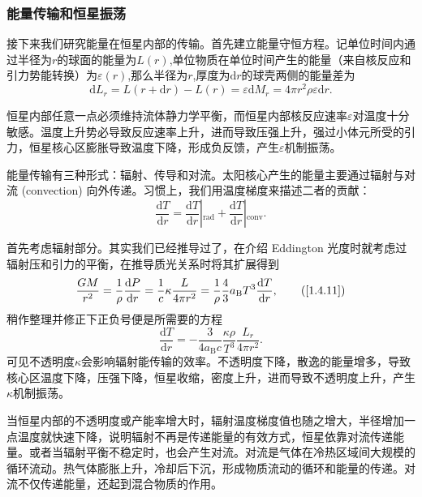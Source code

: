 \documentclass[../天体物理基础.tex]{subfiles}
\begin{document}
\subsubsection{能量传输和恒星振荡}
接下来我们研究能量在恒星内部的传输。首先建立能量守恒方程。记单位时间内通过半径为$r$的球面的能量为$L\left(r\right)$,单位物质在单位时间产生的能量（来自核反应和引力势能转换）为$\varepsilon\left(r\right)$,那么半径为$r$,厚度为$\mathrm{d}r$的球壳两侧的能量差为
\begin{equation}
\mathrm{d}L_{r}=L\left(r+\mathrm{d}r\right)-L\left(r\right)=\varepsilon\mathrm{d}M_{r}=4\pi{}r^{2}\rho\varepsilon\mathrm{d}r.
\end{equation}

恒星内部任意一点必须维持流体静力学平衡，而恒星内部核反应速率$\varepsilon$对温度十分敏感。温度上升势必导致反应速率上升，进而导致压强上升，强过小体元所受的引力，恒星核心区膨胀导致温度下降，形成负反馈，产生$\varepsilon$机制振荡。

能量传输有三种形式：辐射、传导和对流。太阳核心产生的能量主要通过辐射与对流 (convection) 向外传递。习惯上，我们用温度梯度来描述二者的贡献：
\begin{equation}
\frac{\mathrm{d}T}{\mathrm{d}r}=\left.\frac{\mathrm{d}T}{\mathrm{d}r}\right\vert{}_{\text{rad}}+\left.\frac{\mathrm{d}T}{\mathrm{d}r}\right\vert{}_{\text{conv}}.
\end{equation}

首先考虑辐射部分。其实我们已经推导过了，在介绍 Eddington 光度时就考虑过辐射压和引力的平衡，在推导质光关系时将其扩展得到
\begin{equation}
\frac{GM}{r^{2}}=\frac{1}{\rho}\frac{\mathrm{d}P}{\mathrm{d}r}=\frac{1}{c}\kappa\frac{L}{4\pi r^{2}}=\frac{1}{\rho}\frac{4}{3}a_{\text{B}}T^{3}\frac{\mathrm{d}T}{\mathrm{d}r},\tag{\ref{1.4.11}}
\end{equation}
稍作整理并修正下正负号便是所需要的方程
\begin{equation}
\frac{\mathrm{d}T}{\mathrm{d}r}=-\frac{3}{4a_{\text{B}}c}\frac{\kappa\rho}{T^{3}}\frac{L_{r}}{4\pi r^{2}}.
\end{equation}
可见不透明度$\kappa$会影响辐射能传输的效率。不透明度下降，散逸的能量增多，导致核心区温度下降，压强下降，恒星收缩，密度上升，进而导致不透明度上升，产生$\kappa$机制振荡。

当恒星内部的不透明度或产能率增大时，辐射温度梯度值也随之增大，半径增加一点温度就快速下降，说明辐射不再是传递能量的有效方式，恒星依靠对流传递能量。或者当辐射平衡不稳定时，也会产生对流。对流是气体在冷热区域间大规模的循环流动。热气体膨胀上升，冷却后下沉，形成物质流动的循环和能量的传递。对流不仅传递能量，还起到混合物质的作用。
\end{document}

